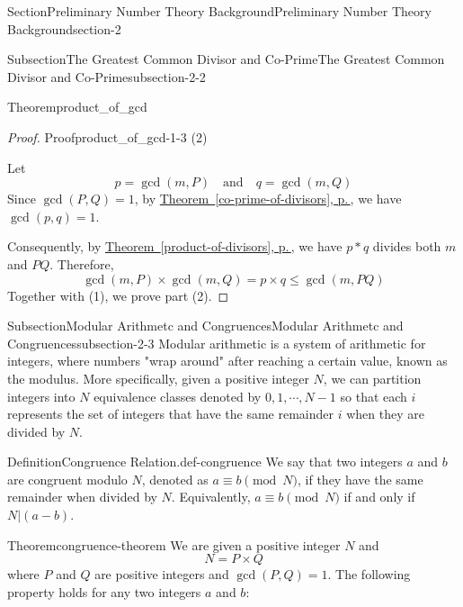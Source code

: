 \documentclass[oneside,12pt,]{article}
\newcommand{\xreffont}{\relax}
\numberwithin{equation}{section}
\begin{document}
\begin{sectionptx}{Section}{Preliminary Number Theory Background}{}{Preliminary Number Theory Background}{}{}{section-2}
\begin{subsectionptx}{Subsection}{The Greatest Common Divisor and Co-Prime}{}{The Greatest Common Divisor and Co-Prime}{}{}{subsection-2-2}
\begin{theorem}{Theorem}{}{}{product_of_gcd}
\begin{proof}{Proof}{}{product_of_gcd-1-3}
(2)%
\par
Let%
\begin{equation*}
p = \gcd(m, P) \quad \text{and} \quad q = \gcd(m, Q)
\end{equation*}
Since \(\gcd(P, Q) = 1\), by \hyperref[co-prime-of-divisors]{Theorem~{\xreffont\ref{co-prime-of-divisors}}, p.\,\pageref{co-prime-of-divisors}}, we have \(\gcd(p, q) = 1\).%
\par
Consequently, by \hyperref[product-of-divisors]{Theorem~{\xreffont\ref{product-of-divisors}}, p.\,\pageref{product-of-divisors}}, we have \(p*q\) divides both \(m\) and \(PQ\). Therefore,%
\begin{equation*}
\gcd(m,P) \times \gcd(m,Q) = p \times q \leq \gcd(m, PQ) 
\end{equation*}
Together with (1), we prove part (2).%
\end{proof}
\end{theorem}
\end{subsectionptx}
%
%
\typeout{************************************************}
\typeout{************************************************}
%
\begin{subsectionptx}{Subsection}{Modular Arithmetc and Congruences}{}{Modular Arithmetc and Congruences}{}{}{subsection-2-3}
Modular arithmetic is a system of arithmetic for integers, where numbers "wrap around" after reaching a certain value, known as the modulus. More specifically, given a positive integer \(N\), we can partition integers into \(N\) equivalence classes denoted by \({0},{1}, \cdots, {N-1}\)  so that each \({i}\) represents the set of integers that have the same remainder \(i\) when they are divided by \(N\).%
\begin{definition}{Definition}{Congruence Relation.}{def-congruence}%
We say that two integers \(a\) and \(b\) are congruent modulo \(N\), denoted as \(a \equiv b \pmod{N}\), if they have the same remainder when divided by \(N\). Equivalently, \(a \equiv b \pmod{N}\) if and only if \(N | (a - b)\).%
\end{definition}
\begin{theorem}{Theorem}{}{}{congruence-theorem}%
We are given a positive integer \(N\) and%
\begin{equation*}
N = P \times Q
\end{equation*}
where \(P\) and \(Q\) are positive integers and \(\gcd(P, Q) = 1\). The following property holds for any two integers \(a\) and \(b\):%
\begin{equation*}

\end{equation*}
\end{theorem}
\end{subsectionptx}
\end{sectionptx}
\end{document}
